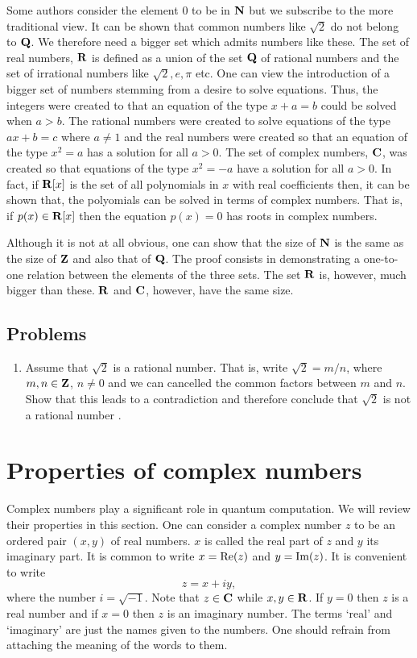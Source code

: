 Some authors consider the element $0$ to be in $\mathbf{N}$ but we subscribe to the 
more traditional view. It can be shown that common numbers like $\sqrt{2}$ do 
not belong to $\mathbf{Q}$. We therefore need a bigger set which admits numbers like 
these. The set of real numbers, $\mathbf{R}$ is defined as a union of the set $\mathbf{Q}$ 
of rational numbers and the  set of irrational numbers like $\sqrt{2}, e, \pi$ 
etc.  One can view the introduction of a bigger set of numbers stemming from a 
desire to solve equations. Thus, the integers were created to that an equation 
of the type $x + a = b$ could be solved when $a > b$. The rational numbers 
were created to solve equations of the type $ax + b = c$ where $a \ne 1$ and 
the real numbers were created so that an equation of the type $x^2 = a$ has a 
solution for all $a > 0$. The set of complex numbers, $\mathbf{C}$, was created so 
that equations of the type $x^2 = -a$ have a solution for all $a > 0$. In fact, 
if $\mathbf{R}[x]$ is the set of all polynomials in $x$ with real coefficients then, 
it can be shown that, the polyomials can be solved in terms of complex numbers. 
That is, if $p(x) \in \mathbf{R}[x]$ then the equation $p(x) = 0$ has roots in 
complex numbers.

Although it is not at all obvious, one can show that the size of $\mathbf{N}$ is the 
same as the size of $\mathbf{Z}$ and also that of $\mathbf{Q}$. The proof consists in 
demonstrating a one-to-one relation between the elements of the three sets. 
The set $\mathbf{R}$ is, however, much bigger than these. $\mathbf{R}$ and $\mathbf{C}$, however, 
have the same size.

\subsection{Problems}
\begin{enumerate}
\item Assume that $\sqrt{2}$ is a rational number. That is, write $\sqrt{2} = 
m/n$, where $m, n \in \mathbf{Z}$, $n \ne 0$ and we can cancelled the common factors 
between $m$ and $n$. Show that this leads to a contradiction and therefore 
conclude that $\sqrt{2}$ is not a rational number \cite{hardy1992mathematician}.
\end{enumerate}

\section{Properties of complex numbers}\label{c1s3}
Complex numbers play a significant role in quantum computation. We will review 
their properties in this section. One can consider a complex number $z$ to be 
an ordered pair $(x, y)$ of real numbers. $x$ is called the real part of $z$ 
and $y$ its imaginary part. It is common to write $x = \operatorname{Re}(z)$ and $y = \operatorname{Im}(z)$.
It is convenient to write
\begin{equation}\label{c1s3e1}
z = x + iy,
\end{equation}
where the number $i = \sqrt{-1}$. Note that $z \in \mathbf{C}$ while $x, y \in \mathbf{R}$. 
If $y=0$ then $z$ is a real number and if $x = 0$ then $z$ is an imaginary 
number. The terms `real' and `imaginary' are just the names given to the 
numbers. One should refrain from attaching the meaning of the words to them. 

